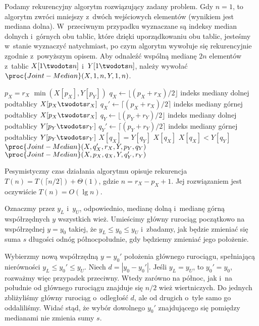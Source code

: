 Podamy rekurencyjny algorytm rozwiązujący zadany problem.
Gdy $n=1$, to algorytm zwróci mniejszy z~dwóch wejściowych elementów (wynikiem jest mediana dolna).
W~przeciwnym przypadku wyznaczane są indeksy median dolnych i~górnych obu tablic, które dzięki uporządkowaniu obu tablic, jesteśmy w~stanie wyznaczyć natychmiast, po czym algorytm wywołuje się rekurencyjnie zgodnie z~powyższym opisem.
Aby odnaleźć wspólną medianę $2n$ elementów z~tablic $X[1\twodots n]$ i~$Y[1\twodots n]$, należy wywołać $\proc{Joint-Median}(X,1,n,Y,1,n)$.
\begin{codebox}
\li	\If $p_X=r_X$
\li		\Then \Return $\min(X[p_X],Y[p_Y])$
		\End
\li	$q_X\gets\lfloor(p_X+r_X)/2\rfloor$ \>\>\>\>\>\>\Comment indeks mediany dolnej podtablicy $X[p_X\twodots r_X]$
\li	$q_X'\gets\lceil(p_X+r_X)/2\rceil$ \>\>\>\>\>\>\Comment indeks mediany górnej podtablicy $X[p_X\twodots r_X]$
\li	$q_Y\gets\lfloor(p_Y+r_Y)/2\rfloor$ \>\>\>\>\>\>\Comment indeks mediany dolnej podtablicy $Y[p_Y\twodots r_Y]$
\li	$q_Y'\gets\lceil(p_Y+r_Y)/2\rceil$ \>\>\>\>\>\>\Comment indeks mediany górnej podtablicy $Y[p_Y\twodots r_Y]$
\li	\If $X[q_X]=Y[q_Y]$
\li		\Then \Return $X[q_X]$
		\End
\li	\If $X[q_X]<Y[q_Y]$
\li		\Then \Return $\proc{Joint-Median}(X,q_X',r_X,Y,p_Y,q_Y)$
\li		\Else \Return $\proc{Joint-Median}(X,p_X,q_X,Y,q_Y',r_Y)$
		\End
\end{codebox}

Pesymistyczny czas działania algorytmu opisuje rekurencja $T(n)=T(\lceil n/2\rceil)+\Theta(1)$, gdzie $n=r_X-p_X+1$.
Jej rozwiązaniem jest oczywiście $T(n)=O(\lg n)$.

\exercise %
Oznaczmy przez $y_L$ i~$y_U$, odpowiednio, medianę dolną i~medianę górną współrzędnych $y$ wszystkich wież.
Umieścimy główny rurociąg początkowo na współrzędnej $y=y_0$ takiej, że $y_L\le y_0\le y_U$ i~zbadamy, jak będzie zmieniać się suma $s$ długości odnóg północ\nbhyphen południe, gdy będziemy zmieniać jego położenie.

Wybierzmy nową współrzędną $y=y_0'$ położenia głównego rurociągu, spełniającą nierówności $y_L\le y_0'\le y_U$.
Niech $d=|y_0-y_0'|$.
Jeśli $y_L=y_U$, to $y_0'=y_0$, rozważmy więc przypadek przeciwny.
Wtedy zarówno na północ, jak i~na południe od głównego rurociągu znajduje się $n/2$ wież wiertniczych.
Do jednych zbliżyliśmy główny rurociąg o~odległość $d$, ale od drugich o~tyle samo go oddaliliśmy.
Widać stąd, że wybór dowolnego $y_0'$ znajdującego się pomiędzy medianami nie zmienia sumy $s$.

